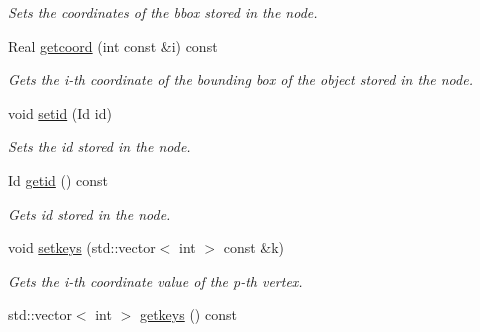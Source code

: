 \begin{DoxyCompactItemize}
\begin{DoxyCompactList}\small\item\em Sets the coordinates of the bbox stored in the node. \item\end{DoxyCompactList}\item 
\hypertarget{classTreeNode_a3eb758dc2378eae56e2b365bae71e909}{
Real \hyperlink{classTreeNode_a3eb758dc2378eae56e2b365bae71e909}{getcoord} (int const \&i) const }
\label{classTreeNode_a3eb758dc2378eae56e2b365bae71e909}

\begin{DoxyCompactList}\small\item\em Gets the i-\/th coordinate of the bounding box of the object stored in the node. \item\end{DoxyCompactList}\item 
\hypertarget{classTreeNode_a4bdc3e9bd742427b7e5ca3c6db7c3ff6}{
void \hyperlink{classTreeNode_a4bdc3e9bd742427b7e5ca3c6db7c3ff6}{setid} (Id id)}
\label{classTreeNode_a4bdc3e9bd742427b7e5ca3c6db7c3ff6}

\begin{DoxyCompactList}\small\item\em Sets the id stored in the node. \item\end{DoxyCompactList}\item 
\hypertarget{classTreeNode_ae18786d641caa8c97511a05e47405708}{
Id \hyperlink{classTreeNode_ae18786d641caa8c97511a05e47405708}{getid} () const }
\label{classTreeNode_ae18786d641caa8c97511a05e47405708}

\begin{DoxyCompactList}\small\item\em Gets id stored in the node. \item\end{DoxyCompactList}\item 
void \hyperlink{classTreeNode_a18c8b24477006cf279fcb5b08fc8b65d}{setkeys} (std::vector$<$ int $>$ const \&k)
\begin{DoxyCompactList}\small\item\em Gets the i-\/th coordinate value of the p-\/th vertex. \item\end{DoxyCompactList}\item 
\hypertarget{classTreeNode_a06f21fbc6588ad144778d045a4798612}{
std::vector$<$ int $>$ \hyperlink{classTreeNode_a06f21fbc6588ad144778d045a4798612}{getkeys} () const }
\label{classTreeNode_a06f21fbc6588ad144778d045a4798612}


\end{DoxyCompactItemize}
